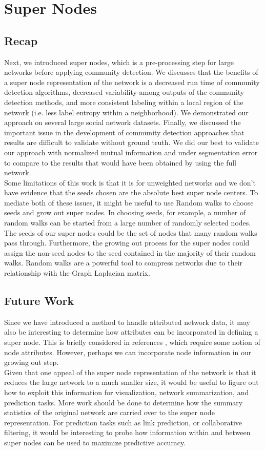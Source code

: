 \section{Super Nodes}
\subsection{Recap}
Next, we introduced super nodes, which is a pre-processing step for large networks before applying community detection. We discusses that the benefits of a super node representation of the network is a decreased run time of community detection algorithms, decreased variability among outputs of the community detection methods, and more consistent labeling within a local region of the network (i.e. less label entropy within a neighborhood). We demonstrated our approach on several large social network datasets. Finally, we discussed the important issue in the development of community detection approaches that results are difficult to validate without ground truth. We did our best to validate our approach with normalized mutual information and under segmentation error to compare to the results that would have been obtained by using the full network. \\
\indent Some limitations of this work is that it is for unweighted networks and we don't have evidence that the seeds chosen are the absolute best super node centers. To mediate both of these issues, it might be useful to use Random walks to choose seeds and grow out super nodes. In choosing seeds, for example, a number of random walks can be started from a large number of randomly selected nodes. The seeds of our super nodes could be the set of nodes that many random walks pass through. Furthermore, the growing out process for the super nodes could assign the non-seed nodes to the seed contained in the majority of their random walks. Random walks are a powerful tool to compress networks due to their relationship with the Graph Laplacian matrix. 
\subsection{Future Work}
\indent Since we have introduced a method to handle attributed network data, it may also be interesting to determine how attributes can be incorporated in defining a super node. This is briefly considered in references \cite{SuperNodeSide,supergenomic}, which require some notion of node attributes. However, perhaps we can incorporate node information in our growing out step.\\
\indent Given that one appeal of the super node representation of the network is that it reduces the large network to a much smaller size, it would be useful to figure out how to exploit this information for visualization, network summarization, and prediction tasks. More work should be done to determine how the summary statistics of the original network are carried over to the super node representation. For prediction tasks such as link prediction, or collaborative filtering, it would be interesting to probe how information within and between super nodes can be used to maximize predictive accuracy. 

